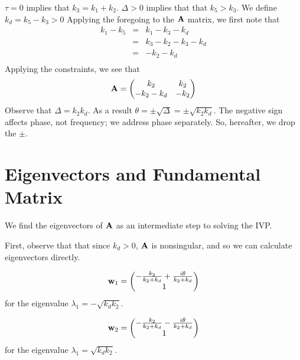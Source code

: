 \documentclass{bmcart}
\begin{document}
$\tau = 0$ implies that $k_3 = k_1 + k_2$. $\Delta > 0$
implies that that $k_5 > k_3$. We define $k_d = k_5 - k_3 > 0$
Applying the foregoing to the ${\bf A}$ matrix, we first note that
\begin{align*}
k_1 - k_5 & = & k_1 - k_3 -k_d \\
& = & k_3 - k_2 - k_3 - k_d \\
& = & -k_2 - k_d \\
\end{align*}
Applying the constraints,
we see that
\begin{equation*}
{\bf A} = 
\begin{pmatrix}
k_2 & k_2 \\
-k_2 - k_d & -k_2 \\
\end{pmatrix}
\end{equation*}
Observe that $\Delta = k_2 k_d$.
As a result
$\theta = \pm \sqrt{\Delta} = \pm \sqrt{k_2 k_d}$. The negative sign affects phase, not frequency; we address phase separately. So, hereafter, we drop
the $\pm$.

\section{Eigenvectors and Fundamental Matrix}

We find the eigenvectors of ${\bf A}$ as an intermediate step to
solving the IVP.

First, observe that that since $k_d > 0$, ${\bf A}$ is nonsingular,
and so we can calculate eigenvectors directly.

\begin{equation*}
    {\bf w}_1 =
    \begin{pmatrix}
- \frac{k_{2}}{k_{2} + k_{d}}
+ \frac{i \theta}{k_{2} + k_{d}} 
\\ 1
\end{pmatrix}
\end{equation*}
for the eigenvalue $\lambda_1 = - \sqrt{k_d k_2}$.

\begin{equation*}
    {\bf w}_2 =
    \begin{pmatrix}
- \frac{k_{2}}{k_{2} + k_{d}}
- \frac{i \theta}{k_{2} + k_{d}} 
\\ 1
\end{pmatrix}
\end{equation*}
for the eigenvalue $\lambda_1 = \sqrt{k_d k_2}$.
\end{document}
